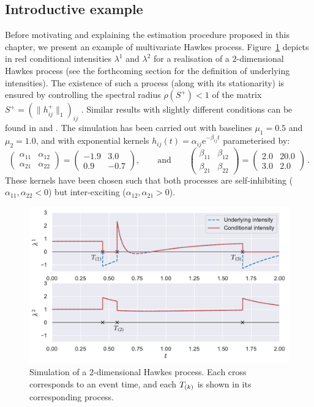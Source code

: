     \subsection{Introductive example}
    Before motivating and explaining the estimation procedure proposed in this chapter, we present an example of multivariate Hawkes process.
    Figure~\ref{fig:chap3_2_dimension_example} depicts in red conditional intensities \(\lambda^1\) and \(\lambda^2\) for a realisation of a \(2\)-dimensional Hawkes process (see the forthcoming section for the definition of underlying intensities). The existence of such a process (along with its stationarity) is ensured by controlling the spectral radius $\rho(S^+) < 1$ of the matrix $S^+ = (\|h_{ij}^+\|_1)_{ij}$ \parencite{Deutsch2022}. Similar results with slightly different conditions can be found in \textcite{Bremaud1996} and \textcite{Sulem2024}.
    The simulation has been carried out with baselines \(\mu_1 = 0.5\) and \(\mu_2 = 1.0\),
    and with exponential kernels \(h_{ij}(t) = \alpha_{ij} \mathrm{e}^{-\beta_{ij}t}\) parameterised by:
    \[
      \begin{pmatrix}
      \alpha_{11} & \alpha_{12}\\
      \alpha_{21} & \alpha_{22}
      \end{pmatrix}=
      \begin{pmatrix}
      -1.9 & 3.0\\
      0.9 & -0.7
      \end{pmatrix},
      \qquad
      \text{and}
      \qquad
      \begin{pmatrix}
      \beta_{11} & \beta_{12}\\
      \beta_{21} & \beta_{22}
      \end{pmatrix} =
      \begin{pmatrix}
      2.0 & 20.0\\
      3.0 & 2.0
      \end{pmatrix}\,.
    \]
    These kernels have been chosen such that both processes are self-inhibiting ($\alpha_{11}, \alpha_{22} < 0$) but inter-exciting ($\alpha_{12}, \alpha_{21} > 0$).

    \begin{figure}[!ht]
    \centering
    \includegraphics[width=.75\linewidth]{images/chapter3/timesMarkedMulti.pdf}
    \caption{Simulation of a \(2\)-dimensional Hawkes process. Each cross corresponds to an event time, and each $T_{(k)}$ is shown in its corresponding process.}
    \label{fig:chap3_2_dimension_example}
    \end{figure}

